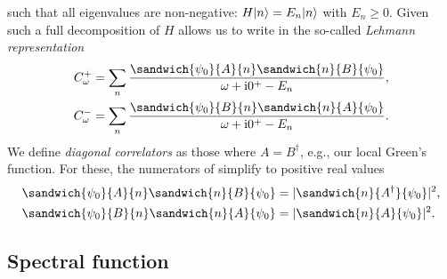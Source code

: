 such that all eigenvalues are non-negative: $H\lvert n\rangle = E_n\lvert n\rangle$ with $E_n \ge 0$.
Given such a full decomposition of $H$ allows us to write 
in the so-called \emph{Lehmann representation}
\begin{subequations}
    \begin{align}
        C^+_\omega
         & =
        \sum_n
        \frac{\sandwich{\psi_0}{A}{n}\sandwich{n}{B}{\psi_0}}{\omega + \mi0^+ - E_n}, \\
        C^-_\omega
         & =
        \sum_n
        \frac{\sandwich{\psi_0}{B}{n}\sandwich{n}{A}{\psi_0}}{\omega + \mi0^+ - E_n}.
    \end{align}%
    \label{eq:lehmann}%
\end{subequations}
We define \emph{diagonal correlators} as those where $A=B^\dag$, e.g.,
our local Green's function.
For these,
the numerators of  simplify to positive real values
\begin{subequations}
    \begin{align}
        \sandwich{\psi_0}{A}{n}\sandwich{n}{B}{\psi_0}
         & =
        |\sandwich{n}{A^\dag}{\psi_0}|^2, \\
        \sandwich{\psi_0}{B}{n}\sandwich{n}{A}{\psi_0}
         & =
        |\sandwich{n}{A}{\psi_0}|^2.
    \end{align}%
\end{subequations}

\subsection{Spectral function}

